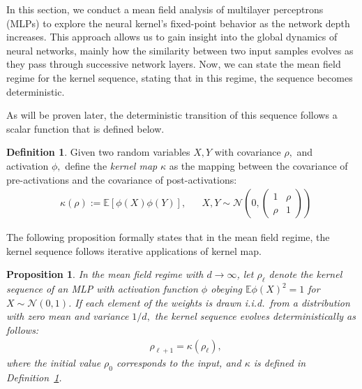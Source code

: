 \documentclass[twoside]{article}
\newcommand{\E}{\mathbb{E}}
\newtheorem{proposition}{Proposition}
\theoremstyle{definition}
\newtheorem{definition}{Definition}
\newcommand{\thomas}[1]{{\color{blue}TH:  \textit{#1}}}
\begin{document}
In this section, we conduct a mean field analysis of multilayer perceptrons (MLPs) to explore the neural kernel's fixed-point behavior as the network depth increases. This approach allows us to gain insight into the global dynamics of neural networks, mainly how the similarity between two input samples evolves as they pass through successive network layers.
Now, we can state the mean field regime for the kernel sequence, stating that in this regime, the sequence becomes deterministic. 

As will be proven later, the deterministic transition of this sequence follows a scalar function that is defined below. 

\begin{definition}
    \label{def:kernel_map}
Given two random variables $X, Y$ with covariance $\rho,$ and activation $\phi,$ define the \emph{kernel map } $\kappa$ as the mapping between the covariance of pre-activations and the covariance of post-activations:
\begin{align}
& \kappa(\rho):=\mathbb{E}[\phi(X)\phi(Y)], && 
 X, Y\sim \mathcal N\left(0, \begin{pmatrix} 1 & \rho \\ \rho & 1 \end{pmatrix}
 \right)
 \label{eq:kernel_map}
\end{align}
\end{definition}

The following proposition formally states that in the mean field regime, the kernel sequence follows iterative applications of kernel map. 

\begin{proposition}
\label{prop:mean_field_kernel_general}
In the mean field regime with $d \to \infty$, let $\rho_\ell$ denote the kernel sequence of an MLP with activation function $\phi$ obeying $\E\phi(X)^2=1$ for $X\sim \mathcal N(0,1)$. If each element of the weights is drawn i.i.d.~from a distribution with zero mean and variance $1/d,$ the kernel sequence evolves deterministically as follows:
\begin{align*}
&\rho_{\ell+1} = \kappa(\rho_\ell),
\end{align*}
where the initial value $\rho_0$ corresponds to the input, and $\kappa$ is defined in Definition~\ref{def:kernel_map}. 

\end{proposition}
\end{document}
